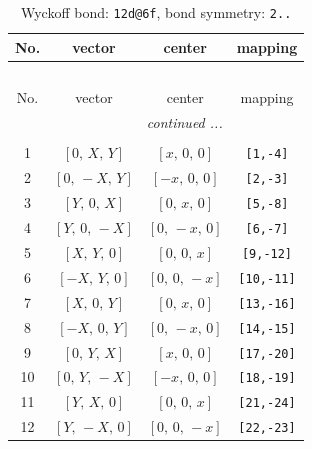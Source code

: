 \documentclass[fleqn,8pt]{jsarticle}
\begin{document}
\begin{longtable}{cccc}
\caption{Wyckoff bond: {\tt 12d@6f}, bond symmetry: {\tt 2..}}
 \\
 \hline \hline
No. & vector & center & mapping \\ \hline \endfirsthead

\multicolumn{3}{l}{\tablename\ \thetable{}} \\
 \hline \hline
No. & vector & center & mapping \\ \hline \endhead

 \hline \hline
\multicolumn{3}{r}{\footnotesize\it continued ...} \\ \endfoot

 \hline \hline
\multicolumn{3}{r}{} \\ \endlastfoot

1 & $\left[ 0,\, X,\, Y \right]$ & $\left[ x,\, 0,\, 0 \right]$ & {\tt [1,-4]} \\ \hline
2 & $\left[ 0,\, - X,\, Y \right]$ & $\left[ - x,\, 0,\, 0 \right]$ & {\tt [2,-3]} \\ \hline
3 & $\left[ Y,\, 0,\, X \right]$ & $\left[ 0,\, x,\, 0 \right]$ & {\tt [5,-8]} \\ \hline
4 & $\left[ Y,\, 0,\, - X \right]$ & $\left[ 0,\, - x,\, 0 \right]$ & {\tt [6,-7]} \\ \hline
5 & $\left[ X,\, Y,\, 0 \right]$ & $\left[ 0,\, 0,\, x \right]$ & {\tt [9,-12]} \\ \hline
6 & $\left[ - X,\, Y,\, 0 \right]$ & $\left[ 0,\, 0,\, - x \right]$ & {\tt [10,-11]} \\ \hline
7 & $\left[ X,\, 0,\, Y \right]$ & $\left[ 0,\, x,\, 0 \right]$ & {\tt [13,-16]} \\ \hline
8 & $\left[ - X,\, 0,\, Y \right]$ & $\left[ 0,\, - x,\, 0 \right]$ & {\tt [14,-15]} \\ \hline
9 & $\left[ 0,\, Y,\, X \right]$ & $\left[ x,\, 0,\, 0 \right]$ & {\tt [17,-20]} \\ \hline
10 & $\left[ 0,\, Y,\, - X \right]$ & $\left[ - x,\, 0,\, 0 \right]$ & {\tt [18,-19]} \\ \hline
11 & $\left[ Y,\, X,\, 0 \right]$ & $\left[ 0,\, 0,\, x \right]$ & {\tt [21,-24]} \\ \hline
12 & $\left[ Y,\, - X,\, 0 \right]$ & $\left[ 0,\, 0,\, - x \right]$ & {\tt [22,-23]} \\
\end{longtable}
\renewcommand{\arraystretch}{1.2}
\end{document}
